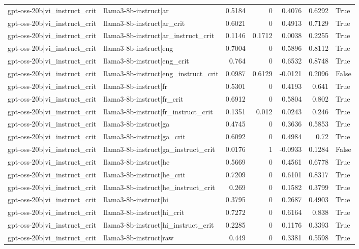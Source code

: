 \begin{table}
\begin{tabular}{l l r r r r l}
gpt-oss-20b|vi_instruct_crit & llama3-8b-instruct|ar & 0.5184 & 0 & 0.4076 & 0.6292 & True \\
gpt-oss-20b|vi_instruct_crit & llama3-8b-instruct|ar_crit & 0.6021 & 0 & 0.4913 & 0.7129 & True \\
gpt-oss-20b|vi_instruct_crit & llama3-8b-instruct|ar_instruct_crit & 0.1146 & 0.1712 & 0.0038 & 0.2255 & True \\
gpt-oss-20b|vi_instruct_crit & llama3-8b-instruct|eng & 0.7004 & 0 & 0.5896 & 0.8112 & True \\
gpt-oss-20b|vi_instruct_crit & llama3-8b-instruct|eng_crit & 0.764 & 0 & 0.6532 & 0.8748 & True \\
gpt-oss-20b|vi_instruct_crit & llama3-8b-instruct|eng_instruct_crit & 0.0987 & 0.6129 & -0.0121 & 0.2096 & False \\
gpt-oss-20b|vi_instruct_crit & llama3-8b-instruct|fr & 0.5301 & 0 & 0.4193 & 0.641 & True \\
gpt-oss-20b|vi_instruct_crit & llama3-8b-instruct|fr_crit & 0.6912 & 0 & 0.5804 & 0.802 & True \\
gpt-oss-20b|vi_instruct_crit & llama3-8b-instruct|fr_instruct_crit & 0.1351 & 0.012 & 0.0243 & 0.246 & True \\
gpt-oss-20b|vi_instruct_crit & llama3-8b-instruct|ga & 0.4745 & 0 & 0.3636 & 0.5853 & True \\
gpt-oss-20b|vi_instruct_crit & llama3-8b-instruct|ga_crit & 0.6092 & 0 & 0.4984 & 0.72 & True \\
gpt-oss-20b|vi_instruct_crit & llama3-8b-instruct|ga_instruct_crit & 0.0176 & 1 & -0.0933 & 0.1284 & False \\
gpt-oss-20b|vi_instruct_crit & llama3-8b-instruct|he & 0.5669 & 0 & 0.4561 & 0.6778 & True \\
gpt-oss-20b|vi_instruct_crit & llama3-8b-instruct|he_crit & 0.7209 & 0 & 0.6101 & 0.8317 & True \\
gpt-oss-20b|vi_instruct_crit & llama3-8b-instruct|he_instruct_crit & 0.269 & 0 & 0.1582 & 0.3799 & True \\
gpt-oss-20b|vi_instruct_crit & llama3-8b-instruct|hi & 0.3795 & 0 & 0.2687 & 0.4903 & True \\
gpt-oss-20b|vi_instruct_crit & llama3-8b-instruct|hi_crit & 0.7272 & 0 & 0.6164 & 0.838 & True \\
gpt-oss-20b|vi_instruct_crit & llama3-8b-instruct|hi_instruct_crit & 0.2285 & 0 & 0.1176 & 0.3393 & True \\
gpt-oss-20b|vi_instruct_crit & llama3-8b-instruct|raw & 0.449 & 0 & 0.3381 & 0.5598 & True \\

\end{tabular}
\end{table}
